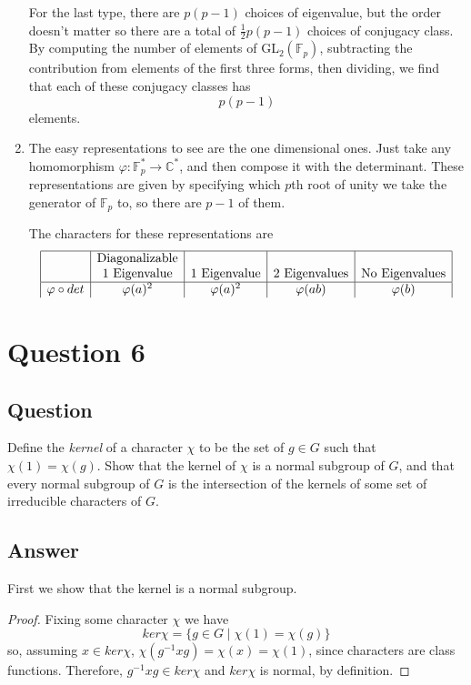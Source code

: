 \documentclass[11pt]{article}
\begin{document}
\begin{enumerate}
For the last type, there are $p(p-1)$ choices of eigenvalue, but the order doesn't matter so there are a total of $\frac{1}{2}p(p-1)$ choices of conjugacy class. By computing the number of elements of GL$_2(\mathbb{F}_p)$, subtracting the contribution from elements of the first three forms, then dividing, we find that each of these conjugacy classes has 
\[p(p-1)\]
elements.
\item The easy representations to see are the one dimensional ones. Just take any homomorphism $\varphi: \mathbb{F}_p^* \to \mathbb{C}^*$, and then compose it with the determinant. These representations are given by specifying which $p$th root of unity we take the generator of $\mathbb{F}_p$ to, so there are $p-1$ of them.

The characters for these representations are
\[\begin{array}{|c|c|c|c|c|}
\hline
& \mbox{Diagonalizable}&&  & \\
& \mbox{1 Eigenvalue}& \mbox{1 Eigenvalue}& \mbox{2 Eigenvalues}&\mbox{No Eigenvalues}\\
\hline
\varphi \circ det & \varphi(a)^2 & \varphi(a)^2 & \varphi(a b) & \varphi(b)\\
\end{array}
\]
\end{enumerate}

\section{Question 6}
\subsection{Question}
Define the \emph{kernel} of a character $\chi$ to be the set of $g \in G$ such that $\chi(1) =\chi(g)$. Show that the kernel of $\chi$ is a normal subgroup of $G$, and that every normal subgroup of $G$ is the intersection of the kernels of some set of irreducible characters of $G$.
\subsection{Answer}
First we show that the kernel is a normal subgroup.
\begin{proof}
Fixing some character $\chi$ we have 
\[ker\chi = \{ g \in G \mid \chi(1) = \chi(g) \}\]
so, assuming $x \in ker\chi$, $\chi(g^{-1} x g ) = \chi(x) = \chi(1)$, since characters are class functions. Therefore, $g^{-1} x g \in ker\chi$ and $ker\chi$ is normal, by definition.
\end{proof}
\end{document}
